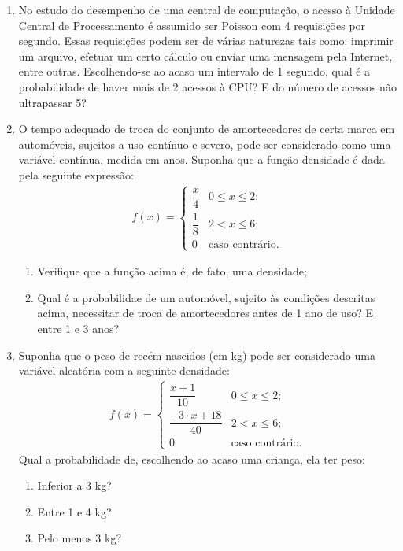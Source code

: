 \documentclass[12pt, a4paper]{article}
\begin{document}
\begin{enumerate}
\item No estudo do desempenho de uma central de computação, o acesso à Unidade Central de Processamento é assumido ser Poisson com 4 requisições por segundo. Essas requisições podem ser de várias naturezas tais como: imprimir um arquivo, efetuar um certo cálculo ou enviar uma mensagem pela Internet, entre outras. Escolhendo-se ao acaso um intervalo de 1 segundo, qual é a probabilidade de haver mais de 2 acessos à CPU? E do número de acessos não ultrapassar 5?

\item O tempo adequado de troca do conjunto de amortecedores de certa marca em automóveis, sujeitos a uso contínuo e severo, pode ser considerado como uma variável contínua, medida em anos. Suponha que a função densidade é dada pela seguinte expressão:
\begin{align*}
f(x) = \begin{cases}
\dfrac{x}{4} & 0 \leq x \leq 2;\\
\dfrac{1}{8} & 2 < x \leq 6;\\
0 & \mbox{caso contrário}.
\end{cases}
\end{align*}
\begin{enumerate}
	\item Verifique que a função acima é, de fato, uma densidade;
	\item Qual é a probabilidae de um automóvel, sujeito às condições descritas acima, necessitar de troca de amortecedores antes de 1 ano de uso? E entre 1 e 3 anos?
\end{enumerate}


\item Suponha que o peso de recém-nascidos (em kg) pode ser considerado uma variável aleatória com a seguinte densidade:
\begin{align*}
f(x) = \begin{cases}
\dfrac{x+1}{10} & 0 \leq x \leq 2;\\
\dfrac{-3\cdot x + 18}{40} & 2 < x \leq 6;\\
0 & \mbox{caso contrário}.
\end{cases}
\end{align*}
Qual a probabilidade de, escolhendo ao acaso uma criança, ela ter peso:
\begin{enumerate}
	\item Inferior a 3 kg?
	\item Entre 1 e 4 kg?
	\item Pelo menos 3 kg?
\end{enumerate}


\end{enumerate}
\end{document}
